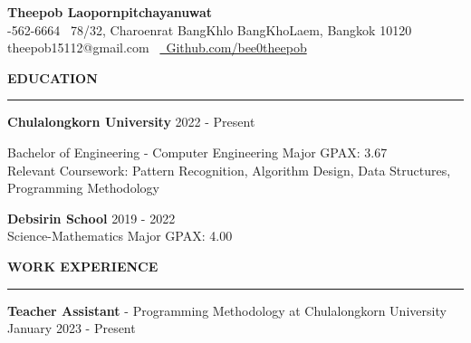 \documentclass[11pt]{article}
\begin{document}
\begin{center}
    {\Large \textbf{Theepob Laopornpitchayanuwat}} \\
    -562-6664 \textbullet \ 78/32, Charoenrat BangKhlo BangKhoLaem, Bangkok 10120 \\
    theepob15112@gmail.com
    \textbullet\ \href{https://github.com/bee0theepob}{\faGithub\ Github.com/bee0theepob}
\end{center}
\textbf{EDUCATION}
\vspace{5pt}
{\color{NavyBlue}\hrule}
\vspace{6pt}

\textbf{Chulalongkorn University} \hfill 2022 - Present

\hspace*{7pt} Bachelor of Engineering - Computer Engineering Major GPAX: 3.67\\
\hspace*{7pt} Relevant Coursework: Pattern Recognition, Algorithm Design, Data Structures, Programming Methodology

\vspace{2pt}

\textbf{Debsirin School} \hfill 2019 - 2022\\
\hspace*{7pt} {Science-Mathematics Major GPAX: 4.00}

\begin{itemize}[noitemsep, topsep=0pt, partopsep=0pt, parsep=0pt]
    \item Thailand Physics Olympiad (TPhO)} - 20th TPhO: Silver Medal

\end{itemize}

\vspace{9pt}
\textbf{WORK EXPERIENCE}
\vspace{5pt}
{\color{NavyBlue}\hrule}
\vspace{6pt}

\textbf{Teacher Assistant} - Programming Methodology at Chulalongkorn University \hfill January 2023 - Present
\end{document}
